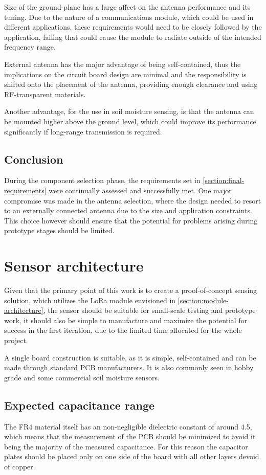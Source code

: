 Size of the ground-plane has a large affect on the antenna performance and its tuning. Due to the nature of a communications module, which could be used in different applications, these requirements would need to be closely followed by the application, failing that could cause the module to radiate outside of the intended frequency range.

External antenna has the major advantage of being self-contained, thus the implications on the circuit board design are minimal and the responsibility is shifted onto the placement of the antenna, providing enough clearance and using RF-transparent materials.

Another advantage, for the use in soil moisture sensing, is that the antenna can be mounted higher above the ground level, which could improve its performance significantly if long-range transmission is required.

\subsection{Conclusion}
During the component selection phase, the requirements set in \ref{section:final-requirements} were continually assessed and successfully met. One major compromise was made in the antenna selection, where the design needed to resort to an externally connected antenna due to the size and application constraints. This choice however should ensure that the potential for problems arising during prototype stages should be limited.

\FloatBarrier
\section{Sensor architecture}
Given that the primary point of this work is to create a proof-of-concept sensing solution, which utilizes the LoRa module envisioned in \ref{section:module-architecture}, the sensor should be suitable for small-scale testing and prototype work, it should also be simple to manufacture and maximize the potential for success in the first iteration, due to the limited time allocated for the whole project.

A single board construction is suitable, as it is simple, self-contained and can be made through standard PCB manufacturers. It is also commonly seen in hobby grade and some commercial soil moisture sensors.

\subsection{Expected capacitance range}
The FR4 material itself has an non-negligible dielectric constant of around 4.5, which means that the measurement of the PCB should be minimized to avoid it being the majority of the measured capacitance. For this reason the capacitor plates should be placed only on one side of the board with all other layers devoid of copper.

